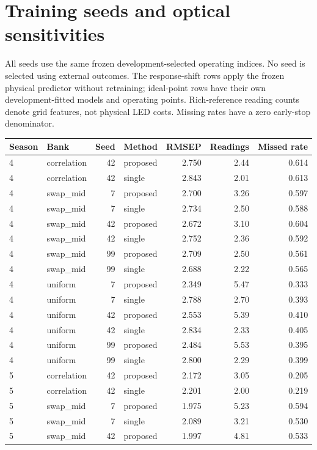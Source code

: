 \documentclass[10pt,a4paper]{article}
\begin{document}
\section{Training seeds and optical sensitivities}
All seeds use the same frozen development-selected operating indices. No seed is selected using external outcomes.
The response-shift rows apply the frozen physical predictor without retraining; ideal-point rows have their own development-fitted models and operating points.
Rich-reference reading counts denote grid features, not physical LED costs. Missing rates have a zero early-stop denominator.
\begin{landscape}\scriptsize
\begin{longtable}{llrlrrr}
\toprule
Season & Bank & Seed & Method & RMSEP & Readings & Missed rate \\
\midrule
4 & correlation & 42 & proposed & 2.750 & 2.44 & 0.614 \\
4 & correlation & 42 & single & 2.843 & 2.01 & 0.613 \\
4 & swap\_mid & 7 & proposed & 2.700 & 3.26 & 0.597 \\
4 & swap\_mid & 7 & single & 2.734 & 2.50 & 0.588 \\
4 & swap\_mid & 42 & proposed & 2.672 & 3.10 & 0.604 \\
4 & swap\_mid & 42 & single & 2.752 & 2.36 & 0.592 \\
4 & swap\_mid & 99 & proposed & 2.709 & 2.50 & 0.561 \\
4 & swap\_mid & 99 & single & 2.688 & 2.22 & 0.565 \\
4 & uniform & 7 & proposed & 2.349 & 5.47 & 0.333 \\
4 & uniform & 7 & single & 2.788 & 2.70 & 0.393 \\
4 & uniform & 42 & proposed & 2.553 & 5.39 & 0.410 \\
4 & uniform & 42 & single & 2.834 & 2.33 & 0.405 \\
4 & uniform & 99 & proposed & 2.484 & 5.53 & 0.395 \\
4 & uniform & 99 & single & 2.800 & 2.29 & 0.399 \\
5 & correlation & 42 & proposed & 2.172 & 3.05 & 0.205 \\
5 & correlation & 42 & single & 2.201 & 2.00 & 0.219 \\
5 & swap\_mid & 7 & proposed & 1.975 & 5.23 & 0.594 \\
5 & swap\_mid & 7 & single & 2.089 & 3.21 & 0.530 \\
5 & swap\_mid & 42 & proposed & 1.997 & 4.81 & 0.533 \\

\end{longtable}
\end{landscape}
\end{document}
